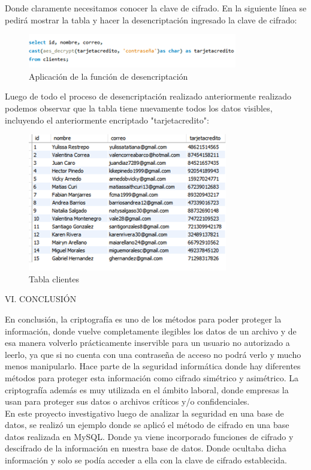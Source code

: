 \documentclass[9pt,24pt,twocolumn]{article}
\begin{document}
{Donde claramente necesitamos conocer la clave de cifrado. En la siguiente línea se pedirá mostrar la tabla y hacer la desencriptación ingresado la clave de cifrado:}

\begin{figure}[h]
\begin{flushleft}
    \includegraphics{bas8}
\end{flushleft}
  \caption{Aplicación de la función de desencriptación}
  \label{fig:8}
\end{figure}

{Luego de todo el proceso de desencriptación realizado anteriormente realizado podemos observar que la tabla tiene nuevamente todos los datos visibles, incluyendo el anteriormente encriptado "tarjetacredito":}

\begin{figure}[h]
\begin{flushleft}
    \includegraphics{bas3}
\end{flushleft}
\caption{Tabla clientes}
  \label{fig:9}
\end{figure}

\begin{center}
{VI. CONCLUSIÓN}
\end{center}

{En conclusión, la criptografía es uno de los métodos para poder proteger la información, donde vuelve completamente ilegibles los datos de un archivo y de esa manera volverlo prácticamente inservible para un usuario no autorizado a
leerlo, ya que si no cuenta con una contraseña de acceso no podrá verlo y mucho menos manipularlo. Hace parte
de la seguridad informática donde hay diferentes métodos para proteger esta información como cifrado simétrico y
asimétrico. La criptografía además es muy utilizada en el ámbito laboral, donde empresas la usan para proteger sus
datos o archivos críticos y/o confidenciales.}
\\
{En este proyecto investigativo luego de analizar la seguridad en una base de datos, se realizó un ejemplo donde se aplicó el método de cifrado en una base datos realizada en MySQL. Donde ya viene incorporado funciones de cifrado y descifrado de la información en nuestra base de datos. Donde ocultaba dicha información y solo se podía acceder a ella con la clave de cifrado establecida.}
\\
\end{document}
